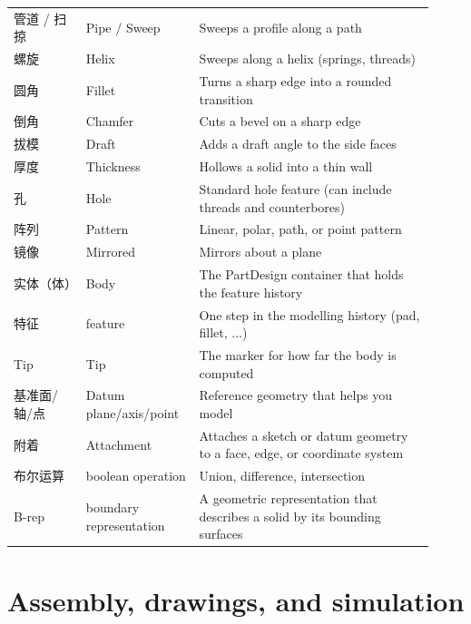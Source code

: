 \begin{longtable}{@{}p{0.16\linewidth}p{0.24\linewidth}p{0.52\linewidth}@{}}
管道 / 扫掠 & Pipe / Sweep & Sweeps a profile along a path \\
螺旋 & Helix & Sweeps along a helix (springs, threads) \\
圆角 & Fillet & Turns a sharp edge into a rounded transition \\
倒角 & Chamfer & Cuts a bevel on a sharp edge \\
拔模 & Draft & Adds a draft angle to the side faces \\
厚度 & Thickness & Hollows a solid into a thin wall \\
孔 & Hole & Standard hole feature (can include threads and counterbores) \\
阵列 & Pattern & Linear, polar, path, or point pattern \\
镜像 & Mirrored & Mirrors about a plane \\
实体（体） & Body & The PartDesign container that holds the feature history \\
特征 & feature & One step in the modelling history (pad, fillet, ...)\\
Tip & Tip & The marker for how far the body is computed \\
基准面/轴/点 & Datum plane/axis/point & Reference geometry that helps you model \\
附着 & Attachment & Attaches a sketch or datum geometry to a face, edge, or coordinate system \\
布尔运算 & boolean operation & Union, difference, intersection \\
B-rep & boundary representation & A geometric representation that describes a solid by its bounding surfaces \\
\bottomrule
\end{longtable}

\section{Assembly, drawings, and simulation}

